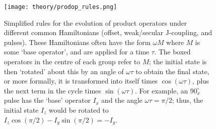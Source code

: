 \begin{figure}[htbp]
    \centering
    \texttt{[image: theory/prodop\_rules.png]}%
    \caption[Simplified rules for product operator evolutions]{
        Simplified rules for the evolution of product operators under different common Hamiltonians (offset, weak/secular J-coupling, and pulses).
        These Hamiltonians often have the form $\omega M$ where $M$ is some `base operator', and are applied for a time $\tau$.
        The boxed operators in the centre of each group refer to $M$; the initial state is then `rotated' about this by an angle of $\omega\tau$ to obtain the final state, or more formally, it is transformed into itself times $\cos(\omega\tau)$, plus the next term in the cycle times $\sin(\omega\tau)$.
        For example, an $90^\circ_x$ pulse has the `base' operator $I_x$ and the angle $\omega\tau = \pi/2$; thus, the initial state $I_z$ would be rotated to $I_z\cos(\pi/2) - I_y\sin(\pi/2) = -I_y$.
    }
    \label{fig:prodop_rules}
\end{figure}


